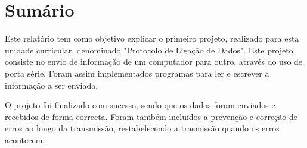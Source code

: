 \documentclass[11pt]{article}
\begin{document}
\newpage
\tableofcontents
\newpage


\newpage

%
%
%
%
%
%
%


\section{Sumário}

Este relatório tem como objetivo explicar o primeiro projeto, realizado para esta unidade curricular, denominado "Protocolo de Ligação de Dados". Este projeto consiste no envio de informação de um computador para outro, através do uso de porta série. Foram assim implementados programas para ler e escrever a informação a ser enviada.
\par O projeto foi finalizado com sucesso, sendo que os dados foram enviados e recebidos de forma correcta. Foram também incluidos a prevenção e correção de erros ao longo da transmissão, restabelecendo a trasmissão quando os erros acontecem.
\end{document}
